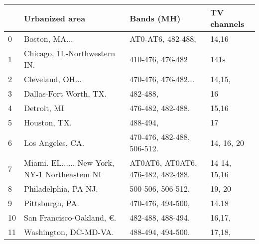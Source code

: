 \begin{tabular}{llll}
\toprule
{} &                                 Urbanized area &                         Bands (MH) &   TV channels \\
\midrule
0  &                                  Boston, MA... &                  AT0-AT6, 482-488, &         14,16 \\
1  &                   Chicago, 1L-Northwestern IN. &                   410-476, 476-482 &          141s \\
2  &                               Cleveland, OH... &                470-476, 476-482... &        14,15, \\
3  &                         Dallas-Fort Worth, TX. &                           482-488, &            16 \\
4  &                                    Detroit, MI &                  476-482, 482-488. &         15,16 \\
5  &                                   Houston, TX. &                           488-494, &            17 \\
6  &                               Los Angeles, CA. &         470-476, 482-488, 506-512. &    14, 16, 20 \\
7  &  Miami. EL...... New York, NY-1 Northeastem NI &  AT0AT6, AT0AT6, 476-482, 482-488. &  14 14, 15,16 \\
8  &                           Philadelphia, PA-NJ. &                  500-506, 506-512. &        19, 20 \\
9  &                                Pittsburgh, PA. &                  470-476, 494-500, &         14.18 \\
10 &                      San Francisco-Oakland, €. &                  482-488, 488-494. &        16,17, \\
11 &                          Washington, DC-MD-VA. &                  488-494, 494-500. &        17,18, \\
\bottomrule
\end{tabular}

